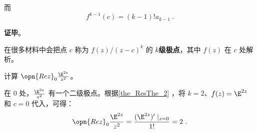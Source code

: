 而
\begin{equation}
f^{k-1}(c)=(k-1)!a_{k-1}~.
\end{equation}

\textbf{证毕}。




在很多材料中会把点 $c$ 称为 $f(z)/(z-c)^k$ 的 $k$\textbf{级极点}，其中 $f(z)$ 在 $c$ 处解析。

\begin{example}{}
计算 $\opn{Rez}_0 \frac{\E^{2z}}{z^2}$。

在 $0$ 处，$\frac{\E^{2z}}{z^2}$ 有一个二级极点。根据\autoref{the_ResThe_2} ，将 $k=2$、$f(z)=\E^{2z}$ 和 $c=0$ 代入，可得：
\begin{equation}
\opn{Rez}_0\frac{\E^{2z}}{z^2}=\frac{(\E^{2z})'\mid_{z=0}}{1!}=2~.
\end{equation}


\end{example}












